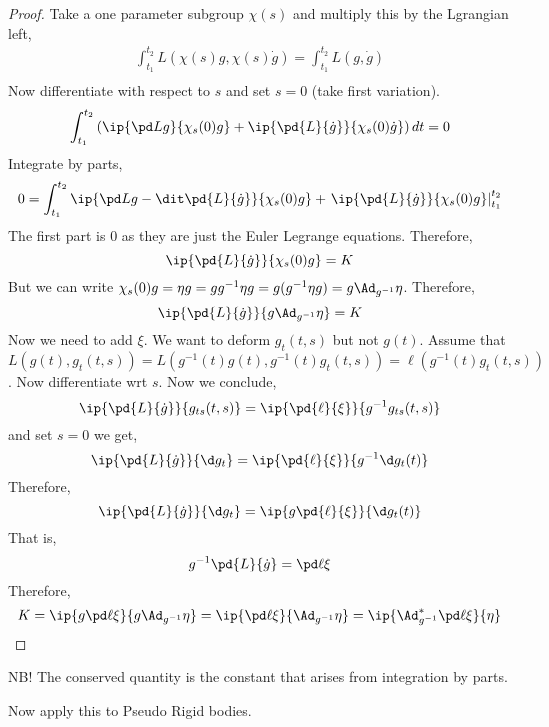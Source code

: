 \begin{proof}
  Take a one parameter subgroup $\chi(s)$ and multiply this by the Lgrangian left,
  \begin{align*}
    \int_{t_1}^{t_2} L(\chi(s)g, \chi(s)\dot g) = \int_{t_1}^{t_2} L(g, \dot g) \\
  \end{align*}
  Now differentiate with respect to $s$ and set $s = 0$ (take first variation).
  $$ \int_{t_1}^{t_2} \left(\ip{\pd L g}{\chi_s(0)g} + \ip{\pd{L}{\dot g}}{\chi_s(0)\dot g}\right)dt = 0 $$
  Integrate by parts,
  $$ 0 = \int_{t_1}^{t_2} \ip{\pd L g - \dit \pd{L}{\dot g}}{\chi_s(0)g} + \left.\ip{\pd{L}{\dot g}}{\chi_s(0)g}\right|_{t_1}^{t_2} $$
  The first part is $0$ as they are just the Euler Legrange equations. Therefore,
  $$ \ip{\pd{L}{\dot g}}{\chi_s(0)g} = K $$
  But we can write $\chi_s(0)g = \eta g = gg^{-1}\eta g = g(g^{-1}\eta g) = g\Ad_{g^{-1}}\eta$. Therefore,
  $$ \ip{\pd{L}{\dot g}}{g\Ad_{g^{-1}}\eta} = K $$
  Now we need to add $\xi$. We want to deform $g_t(t, s)$ but not $g(t)$. Assume that $L(g(t), g_t(t, s)) = L(g^{-1}(t)g(t),  g^{-1}(t)g_t(t, s)) = \ell(g^{-1}(t)g_t(t,s))$. Now differentiate wrt $s$. Now we conclude,
  $$ \ip{\pd{L}{\dot g}}{g_{ts}(t, s)} = \ip{\pd{\ell}{\xi}}{g^{-1}g_{ts}(t, s)} $$
   and set $s = 0$ we get,
   $$ \ip{\pd{L}{\dot g}}{\d g_{t}} = \ip{\pd{\ell}{\xi}}{g^{-1}\d g_{t}(t)} $$
   Therefore,
   $$ \ip{\pd{L}{\dot g}}{\d g_{t}} = \ip{g\pd{\ell}{\xi}}{\d g_{t}(t)} $$
   That is,
   $$ g^{-1}\pd{L}{\dot g} = \pd \ell \xi $$
   Therefore,
   $$ K = \ip{g\pd \ell \xi}{g\Ad_{g^{-1}}\eta} = \ip{\pd \ell \xi}{\Ad_{g^{-1}}\eta} = \ip{\Ad^*_{g^{-1}}\pd \ell \xi}{\eta} $$
\end{proof}
NB! The conserved quantity is the constant that arises from integration by parts.

\begin{eg}
  Now apply this to Pseudo Rigid bodies.
\end{eg}